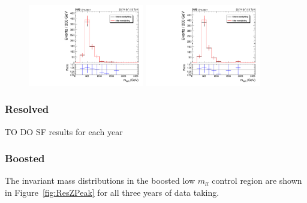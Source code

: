 \begin{figure}[htbp]
  \includegraphics[width=0.45\textwidth]{figures/2018/Boosted_SR_Electron_WRCand_Mass.pdf}
  \hspace{0.01\textwidth}
  \includegraphics[width=0.45\textwidth]{figures/2018/Boosted_SR_Muon_WRCand_Mass.pdf}

  \label{fig:BkgdZptSRCompBoosted}
\end{figure}



\subsubsection{Resolved}

{\color{red} TO DO SF results for each year}

\subsubsection{Boosted}
\iffalse
The invariant mass distributions in the boosted low $m_{ll}$ control region are shown in Figure~\ref{fig:ResZPeak} for all three years of data taking.

